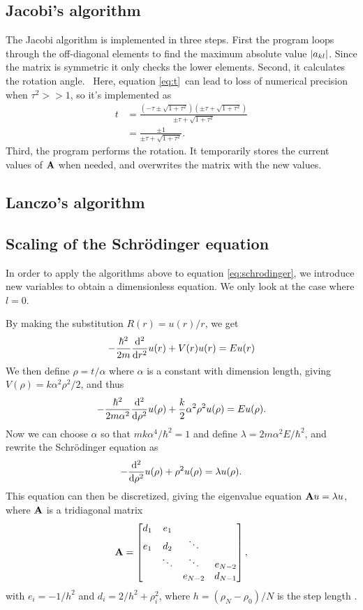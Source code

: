 \documentclass[a4paper,10pt,twocolumn]{article}
\newcommand{\note}[1]{{\color{red}\quad[$\backslash!/$: #1]}}	%
\begin{document}
\subsection*{Jacobi's algorithm}
The Jacobi algorithm is implemented in three steps. First the program loops through the off-diagonal elements to find the maximum absolute value $\abs{a_{kl}}$. Since the matrix is symmetric it only checks the lower elements. 
Second, it calculates the rotation angle. \note{add calculation to theory} Here, equation \ref{eq:t} can lead to loss of numerical precision when $\tau^2 >> 1$, so it's implemented as
\begin{align*}
t &= \frac{(-\tau\pm\sqrt{1+\tau^2})(\pm\tau+\sqrt{1+\tau^2})}{\pm\tau+\sqrt{1+\tau^2}}
\\&= \frac{\pm1}{\pm\tau + \sqrt{1+\tau^2}}.
\end{align*}
Third, the program performs the rotation. It temporarily stores the current values of $\vb{A}$ when needed, and overwrites the matrix with the new values.   

\subsection*{Lanczo's algorithm}


\subsection*{Scaling of the Schrödinger equation}
In order to apply the algorithms above to equation \ref{eq:schrodinger}, we introduce new variables to obtain a dimensionless equation. We only look at the case where $l=0$. 

By making the substitution $R(r) = u(r)/r$, we get
\[
-\frac{\hbar^2}{2m}\dv[2]{r}u(r) + V(r)u(r) = Eu(r)
\]
We then define $\rho = t/\alpha$ where $\alpha$ is a constant with dimension length, giving $V(\rho) = k\alpha^2\rho^2/2$, and thus
\[
-\frac{\hbar^2}{2m\alpha^2}\dv[2]{\rho}u(\rho) + \frac{k}{2}\alpha^2\rho^2u(\rho) = Eu(\rho).
\] 
Now we can choose $\alpha$ so that $mk\alpha^4/\hbar^2 = 1$ and define $\lambda = 2m\alpha^2E/\hbar^2$, and rewrite the Schrödinger equation as
\[
-\dv[2]{\rho}u(\rho) + \rho^2u(\rho) = \lambda u(\rho).
\]
This equation can then be discretized, giving the eigenvalue equation $\vb{A}u = \lambda u$, where $\vb{A}$ is a tridiagonal matrix
\[
\vb{A} = 
\bmqty{	d_1 & e_1 & &  \\
		e_1	& d_2 & \ddots & \\
		 & \ddots & \ddots & e_{N-2}\\
		 & & e_{N-2} & d_{N-1}},	
\] 
with $e_i = -1/h^2$ and $d_i = 2/h^2+\rho_i^2$, where $h = (\rho_N-\rho_0)/N$ is the step length \cite{labtext}.
\end{document}
